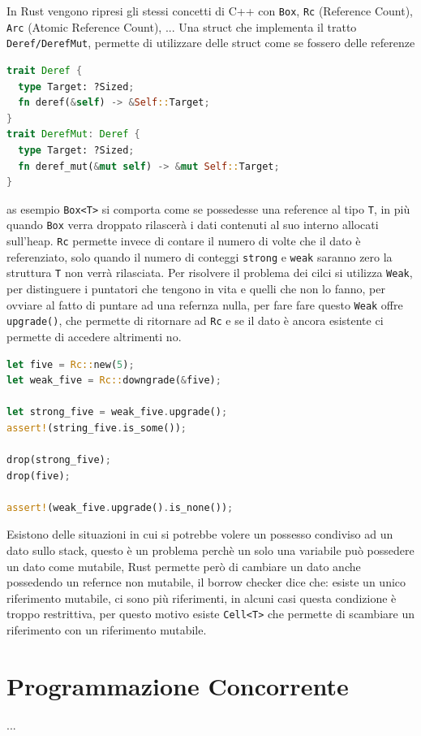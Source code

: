 \documentclass[12pt]{article}
\begin{document}
In Rust vengono ripresi gli stessi concetti di C++ con \texttt{Box}, \texttt{Rc} (Reference Count), \texttt{Arc} (Atomic Reference Count), ... Una struct che implementa il tratto \texttt{Deref/DerefMut}, permette di utilizzare delle struct come se fossero delle referenze
\begin{lstlisting}[language=rust]
trait Deref {
  type Target: ?Sized;
  fn deref(&self) -> &Self::Target;
}
trait DerefMut: Deref {
  type Target: ?Sized;
  fn deref_mut(&mut self) -> &mut Self::Target;
}
\end{lstlisting}
as esempio \texttt{Box<T>} si comporta come se possedesse una reference al tipo \texttt{T}, in pi\`u quando \texttt{Box} verra droppato rilascer\`a i dati contenuti al suo interno allocati sull'heap. \texttt{Rc} permette invece di contare il numero di volte che il dato \`e referenziato, solo quando il numero di conteggi \texttt{strong} e \texttt{weak} saranno zero la struttura \texttt{T} non verr\`a rilasciata. Per risolvere il problema dei cilci si utilizza \texttt{Weak}, per distinguere i puntatori che tengono in vita e quelli che non lo fanno, per ovviare al fatto di puntare ad una refernza nulla, per fare fare questo \texttt{Weak} offre \texttt{upgrade()}, che permette di ritornare ad \texttt{Rc} e se il dato \`e ancora esistente ci permette di accedere altrimenti no.
\begin{lstlisting}[language=rust]
let five = Rc::new(5);
let weak_five = Rc::downgrade(&five);

let strong_five = weak_five.upgrade();
assert!(string_five.is_some());

drop(strong_five);
drop(five);

assert!(weak_five.upgrade().is_none());
\end{lstlisting}
Esistono delle situazioni in cui si potrebbe volere un possesso condiviso ad un dato sullo stack, questo \`e un problema perch\`e un solo una variabile pu\`o possedere un dato come mutabile, Rust permette per\`o di cambiare un dato anche possedendo un refernce non mutabile, il borrow checker dice che: esiste un unico riferimento mutabile, ci sono pi\`u riferimenti, in alcuni casi questa condizione \`e troppo restrittiva, per questo motivo esiste \texttt{Cell<T>} che permette di scambiare un riferimento con un riferimento mutabile.


\section{Programmazione Concorrente}
...
\end{document}
